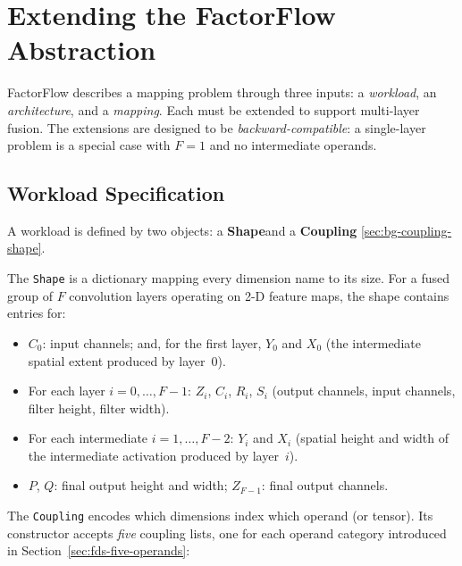\section{Extending the FactorFlow Abstraction}
\label{sec:ps-abstraction}

FactorFlow describes a mapping problem through three inputs: a
\emph{workload}, an \emph{architecture}, and a \emph{mapping}.
Each must be extended to support multi-layer fusion.
The extensions are designed to be \emph{backward-compatible}: a
single-layer problem is a special case with $F = 1$ and no
intermediate operands.

\subsection{Workload Specification}
\label{sec:ps-workload-spec}

A workload is defined by two objects: a \textbf{Shape}and a
\textbf{Coupling} \ref{sec:bg-coupling-shape}.

The \texttt{Shape} is a dictionary mapping every dimension name to its
size.
For a fused group of $F$ convolution layers operating on 2-D feature
maps, the shape contains entries for:
\begin{itemize}
  \item $C_0$: input channels; and, for the first layer, $Y_0$ and $X_0$
        (the intermediate spatial extent produced by layer~0).
  \item For each layer $i = 0, \dots, F\!-\!1$: $Z_i$, $C_i$, $R_i$, $S_i$
        (output channels, input channels, filter height, filter width).
  \item For each intermediate $i = 1, \dots, F\!-\!2$: $Y_i$ and $X_i$
        (spatial height and width of the intermediate activation produced
        by layer~$i$).
  \item $P$, $Q$: final output height and width; $Z_{F-1}$: final output
        channels.
\end{itemize}

\noindent
The \texttt{Coupling} encodes which dimensions index which operand (or tensor).
Its constructor accepts \emph{five} coupling lists, one for each
operand category introduced in Section~\ref{sec:fds-five-operands}:


